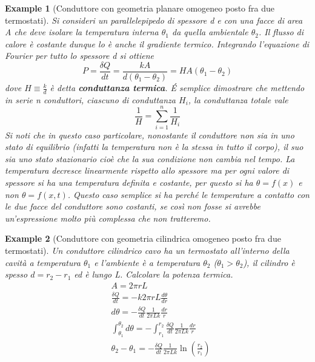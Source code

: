 \documentclass[10pt,a4paper]{article}
\newtheorem{example}{Example}
\begin{document}
\begin{example}[Conduttore con geometria planare omogeneo posto fra due termostati]
	Si consideri un parallelepipedo di spessore d e con una facce di area A che deve isolare la temperatura interna $\theta_1$ da quella ambientale $\theta_2$. Il flusso di calore è costante dunque lo è anche il gradiente termico. Integrando l'equazione di Fourier per tutto lo spessore d si ottiene 
	\[P = \frac{\delta Q}{dt}=\frac{k A}{d(\theta_1 - \theta_2)}= H A (\theta_1 - \theta_2)\]
	dove \(H\equiv \frac{k}{d}\) è detta \textbf{conduttanza termica}. \'{E} semplice dimostrare che mettendo in serie n conduttori, ciascuno di conduttanza $H_i$, la conduttanza totale vale
	\[\frac{1}{H} = \sum_{i = 1}^{n}\frac{1}{H_i}\]
	Si noti che in questo caso particolare, nonostante il conduttore non sia in uno stato di equilibrio (infatti la temperatura non è la stessa in tutto il corpo), il suo sia uno stato stazionario cioè che la sua condizione non cambia nel tempo. La temperatura decresce linearmente rispetto allo spessore ma per ogni valore di spessore si ha una temperatura definita e costante, per questo si ha $\theta = f(x)$ e non $\theta= f(x, t)$. Questo caso semplice si ha perché le temperature a contatto con le due facce del conduttore sono costanti, se così non fosse si avrebbe un'espressione molto più complessa che non tratteremo. 
\end{example}

\begin{example}[Conduttore con geometria cilindrica omogeneo posto fra due termostati]
	Un conduttore cilindrico cavo ha un termostato all'interno della cavità a temperatura $\theta_1$ e l'ambiente è a temperatura $\theta_2$ ($\theta_1 > \theta_2$), il cilindro è spesso \(d = r_2-r_1\) ed è lungo L. Calcolare la potenza termica. 
	\begin{align*}
		&A = 2\pi r L\\
		&\frac{\delta Q}{dt} = -k 2 \pi r L \frac{d\theta}{d r}\\
		&d\theta = -\frac{\delta Q}{d t}\frac{1}{2\pi L k}\frac{dr}{r}\\
		&\int_{\theta_1}^{\theta_2} d\theta = - \int_{r_1}^{r_2}  \frac{\delta Q}{d t}\frac{1}{2\pi L k}\frac{dr}{r}\\
		&\theta_2 - \theta_1 = -\frac{\delta Q}{d t}\frac{1}{2\pi L k}\ln\left(\frac{r_2}{r_1}\right)
	\end{align*}
\end{example}
\end{document}
